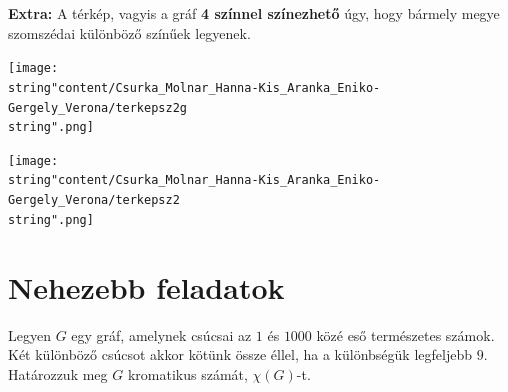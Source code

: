 \begin{solution}
	\bigskip{}
	
	\textbf{Extra:} A térkép, vagyis a gráf \textbf{4 színnel színezhető}
	úgy, hogy bármely megye szomszédai különböző színűek legyenek.
	\begin{center}
		\begin{minipage}[c]{0.45\textwidth}%
			\centering \texttt{[image: \\string"content/Csurka\_Molnar\_Hanna-Kis\_Aranka\_Eniko-Gergely\_Verona/terkepsz2g\\string".png]} %
		\end{minipage}\hfill{}%
		\begin{minipage}[c]{0.45\textwidth}%
			\centering \texttt{[image: \\string"content/Csurka\_Molnar\_Hanna-Kis\_Aranka\_Eniko-Gergely\_Verona/terkepsz2\\string".png]} %
		\end{minipage}
		\par\end{center}
\end{solution}

\section*{Nehezebb feladatok}
\begin{extraproblem}
	Legyen $G$ egy gráf, amelynek csúcsai az $1$ és $1000$ közé eső
	természetes számok. Két különböző csúcsot akkor kötünk össze éllel,
	ha a különbségük legfeljebb $9$. Határozzuk meg $G$ kromatikus számát,
	$\chi(G)$-t. 
\end{extraproblem}

